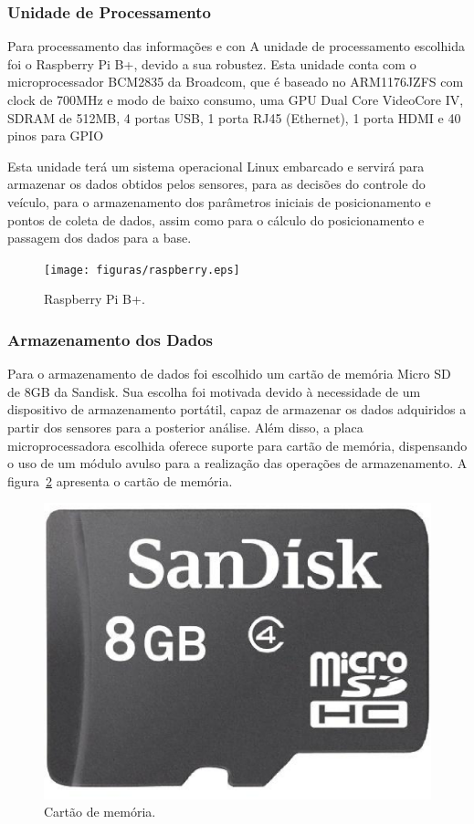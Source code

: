   \subsubsection{Unidade de Processamento}

  Para processamento das informações e con
  A unidade de processamento escolhida foi o Raspberry Pi B+,
  devido a sua robustez. Esta unidade conta com o microprocessador
  BCM2835 da Broadcom, que é baseado no ARM1176JZFS com clock de
  700MHz e modo de baixo consumo, uma GPU Dual Core VideoCore
  IV\textregistered, SDRAM de 512MB, 4 portas USB, 1 porta RJ45
  (Ethernet), 1 porta HDMI e 40 pinos para GPIO~\cite{raspref}

  Esta unidade terá um sistema operacional Linux embarcado e
  servirá para armazenar os dados obtidos pelos sensores, para
  as decisões do controle do veículo, para o armazenamento dos
  parâmetros iniciais de posicionamento e pontos de coleta de
  dados, assim como para o cálculo do posicionamento e passagem
  dos dados para a base.

  \begin{figure}[!htbp]
  \begin{center}
  \texttt{[image: figuras/raspberry.eps]}
  \caption{\label{fig:raspberry}Raspberry Pi B+.}
  \end{center}
  \end{figure}

  \subsubsection{Armazenamento dos Dados}

  Para o armazenamento de dados foi escolhido um cartão de memória
  Micro SD de 8GB da Sandisk. Sua escolha foi motivada devido à
  necessidade de um dispositivo de armazenamento portátil, capaz de
  armazenar os dados adquiridos a partir dos sensores para a posterior
  análise. Além disso, a placa microprocessadora escolhida oferece
  suporte para cartão de memória, dispensando o uso de um módulo avulso
  para a realização das operações de armazenamento. A figura~\ref{fig:sdcard}
  apresenta o cartão de memória.

  \begin{figure}[!htbp]
  \begin{center}
  \includegraphics[width=.5\textwidth]{figuras/sdcard.eps}
  \caption{\label{fig:sdcard}Cartão de memória.}
  \end{center}
  \end{figure}

